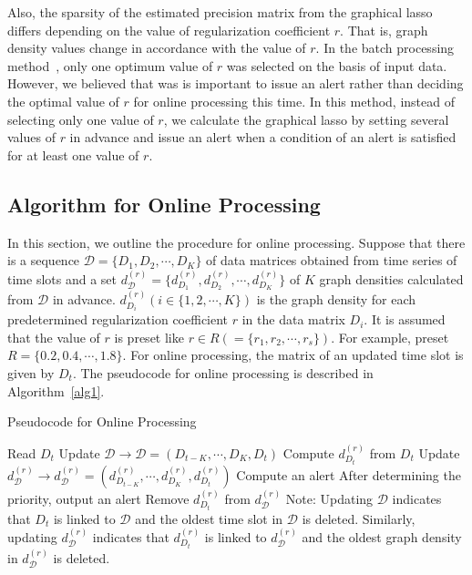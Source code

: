 \documentclass[letterpaper]{sig-alternate-10pt}
\begin{document}
Also, the sparsity of the estimated precision matrix from the graphical lasso differs depending on the value of regularization coefficient $r$.
That is, graph density values change in accordance with the value of $r$.
In the batch processing method~\cite{Han}, only one optimum value of $r$ was selected on the basis of input data.
However, we believed that was is important to issue an alert rather than deciding the optimal value of $r$ for online processing this time.
In this method, instead of selecting only one value of $r$, we calculate the graphical lasso by setting several values of $r$ in advance and issue an alert when a condition of an alert is satisfied for at least one value of $r$.


\subsection{Algorithm for Online Processing}
In this section, we outline the procedure for online processing.
Suppose that there is a sequence $\mathcal{D}=\{D_1, D_2, \cdots, D_K\}$ of data matrices obtained from time series of time slots and a set $d_{\mathcal{D}}^{(r)}=\{d^{(r)}_{D_1}, d^{(r)}_{D_2}, \cdots, d^{(r)}_{D_K}\}$ of $K$ graph densities calculated from $\mathcal{D}$ in advance.
$d^{(r)}_{D_i} (i \in \{1, 2, \cdots, K\})$ is the graph density for each predetermined regularization coefficient $r$ in the data matrix $D_i$.
It is assumed that the value of $r$ is preset like $r \in R ( =\{r_1, r_2, \cdots, r_s\} )$.
For example, preset $R=\{0.2, 0.4, \cdots, 1.8\}$.
For online processing, the matrix of an updated time slot is given by $D_t$.
The pseudocode for online processing is described in Algorithm~\ref{alg1}.

\begin{algorithm}[h]
\caption{Pseudocode for Online Processing}
\label{alg1}
\begin{algorithmic}
	\STATE Read $D_t$
	\STATE Update $\mathcal{D} \longrightarrow \mathcal{D}=(D_{t-K}, \cdots, D_{K}, D_{t})$
		\STATE Compute $d_{D_t}^{(r)}$ from $D_t$
		\STATE Update $d_{\mathcal{D}}^{(r)} \longrightarrow d_{\mathcal{D}}^{(r)}=(d^{(r)}_{D_{t-K}}, \cdots, d^{(r)}_{D_K}, d^{(r)}_{D_t})$
		\STATE Compute an alert
		\vspace*{0.1cm}
			\vspace*{0.1cm}
			\STATE After determining the priority, output an alert
			\STATE Remove $d_{D_t}^{(r)}$ from $d_{\mathcal{D}}^{(r)}$
		\ENDIF
	\ENDFOR
\ENDFOR
\STATE Note: Updating $\mathcal{D}$ indicates that $D_t$ is linked to $\mathcal{D}$ and the oldest time slot in $\mathcal{D}$ is deleted.
Similarly, updating $d_{\mathcal{D}}^{(r)}$ indicates that $d_{D_t}^{(r)}$ is linked to $d_{\mathcal{D}}^{(r)}$ and the oldest graph density in $d_{\mathcal{D}}^{(r)}$ is deleted.
\end{algorithmic}
\end{algorithm}
\end{document}
